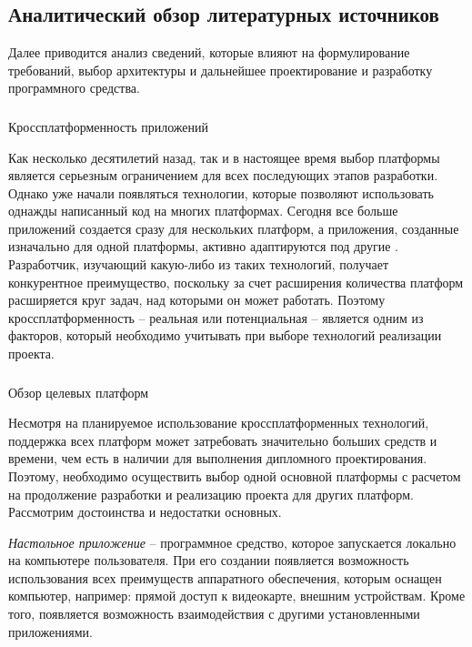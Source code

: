 \subsection{Аналитический обзор литературных источников}
\label{sec:analysis:literature}

Далее приводится анализ сведений, которые влияют на формулирование требований, выбор архитектуры и дальнейшее проектирование и разработку программного средства.

\subsubsection{} Кроссплатформенность приложений
\label{sec:analysis:literature:crossplatform}

Как несколько десятилетий назад, так и в настоящее время выбор платформы является серьезным ограничением для всех последующих этапов разработки. Однако уже начали появляться технологии, которые позволяют использовать однажды написанный код на многих платформах. Сегодня все больше приложений создается сразу для нескольких платформ, а приложения, созданные изначально для одной платформы, активно адаптируются под другие \cite{habr_crossplatform}. Разработчик, изучающий какую-либо из таких технологий, получает конкурентное преимущество, поскольку за счет расширения количества платформ расширяется круг задач, над которыми он может работать. Поэтому кроссплатформенность -- реальная или потенциальная -- является одним из факторов, который необходимо учитывать при выборе технологий реализации проекта.

\subsubsection{} Обзор целевых платформ
\label{sec:analysis:literature:platforms}

Несмотря на планируемое использование кроссплатформенных технологий, поддержка всех платформ может затребовать значительно больших сред\-ств и времени, чем есть в наличии для выполнения дипломного проектирования. Поэтому, необходимо осуществить выбор одной основной платформы с расчетом на продолжение разработки и реализацию проекта для других платформ. Рассмотрим достоинства и недостатки основных.

\emph{Настольное приложение} -- программное средство, которое запускается локально на компьютере пользователя. При его создании появляется возможность использования всех преимуществ аппаратного обеспечения, которым оснащен компьютер, например: прямой доступ к видеокарте, внешним устройствам. Кроме того, появляется возможность взаимодействия с другими установленными приложениями.

